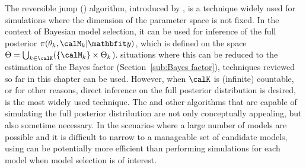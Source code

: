 The reversible jump \mcmc (\rjmcmc) algorithm, introduced by \cite{Green:1995dg}, is a technique widely used for simulations where the dimension of the parameter space is not fixed. In the context of Bayesian model selection, it can be used for inference of the full posterior $\pi(\theta_k,\calM_k|\data)$, which is defined on the space $\Theta = \bigcup_{k\in\calK}(\{\calM_k\}\times\Theta_k$).  situations where this can be reduced to the estimation of the Bayes factor (Section~\ref{sub:Bayes factor}), techniques reviewed so far in this chapter can be used. However, when $\calK$ is (infinite) countable, or for other reasons, direct inference on the full posterior distribution is desired, \rjmcmc is the most widely used technique. The \rjmcmc and other algorithms that are capable of simulating the full posterior distribution are not only conceptually appealing, but also sometime necessary. In the scenarios where a large number of models are possible and it is difficult to narrow  to a manageable set of candidate models, using \rjmcmc can be potentially more efficient than performing simulations for each model when model selection is of interest.

